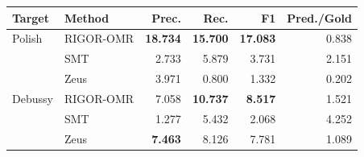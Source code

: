 \begin{center}
\begin{minipage}{\columnwidth}
\label{tab:zero-shot}
\centering
\small
\setlength{\tabcolsep}{2.5pt}
\begin{tabular}{@{}llrrrr@{}}
\toprule
Target & Method & Prec. & Rec. & F1 & Pred./Gold \\
\midrule
Polish & RIGOR-OMR & \textbf{18.734} & \textbf{15.700} & \textbf{17.083} & 0.838 \\
 & SMT & 2.733 & 5.879 & 3.731 & 2.151 \\
 & Zeus & 3.971 & 0.800 & 1.332 & 0.202 \\
\midrule
Debussy & RIGOR-OMR & 7.058 & \textbf{10.737} & \textbf{8.517} & 1.521 \\
 & SMT & 1.277 & 5.432 & 2.068 & 4.252 \\
 & Zeus & \textbf{7.463} & 8.126 & 7.781 & 1.089 \\
\bottomrule
\end{tabular}
\end{minipage}
\end{center}
